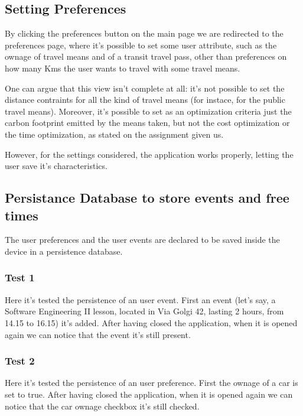 \subsection{Setting Preferences}
By clicking the preferences button on the main page we are redirected to the preferences page, where it's possible to set some user attribute, such as the ownage of travel means and of a transit travel pass, other than preferences on how many Kms the user wants to travel with some travel means.

One can argue that this view isn't complete at all: it's not possible to set the distance contraints for all the kind of travel means (for instace, for the public travel means).
Moreover, it's possible to set as an optimization criteria just the carbon footprint emitted by the means taken, but not the cost optimization or the time optimization, as stated on the assignment given us.


However, for the settings considered, the application works properly, letting the user save it's characteristics.

\subsection{Persistance Database to store events and free times}
The user preferences and the user events are declared to be saved inside the device in a persistence database.

\subsubsection{Test 1}
Here it's tested the persistence of an user event.
First an event (let's say, a Software Engineering II lesson, located in Via Golgi 42, lasting 2 hours, from 14.15 to 16.15) it's added. After having closed the application, when it is opened again we can notice that the event it's still present.


\subsubsection{Test 2}
Here it's tested the persistence of an user preference.
First the ownage of a car is set to true. After having closed the application, when it is opened again we can notice that the car ownage checkbox it's still checked.

